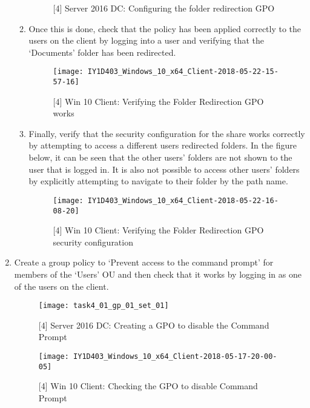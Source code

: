 \begin{enumerate}[series=task4methodology1]
\begin{enumerate}[label=(\alph*)]
\begin{figure}[H]
          \caption{[4] Server 2016 DC: Configuring the folder redirection GPO}
          \label{fig:task4:gp3a4}
        \end{figure}
      \item Once this is done, check that the policy has been applied correctly to the users on the client by logging into a user and verifying that the `Documents' folder has been redirected.
        \begin{figure}[H]
          \centering
          \captionsetup{skip=2pt}
          \texttt{[image: IY1D403\_Windows\_10\_x64\_Client-2018-05-22-15-57-16]}
          \caption{[4] Win 10 Client: Verifying the Folder Redirection GPO works}
          \label{fig:task4:gp3b1}
        \end{figure}
      \item Finally, verify that the security configuration for the share works correctly by attempting to access a different users redirected folders. In the figure below, it can be seen that the other users' folders are not shown to the user that is logged in. It is also not possible to access other users' folders by explicitly attempting to navigate to their folder by the path name.
        \begin{figure}[H]
          \centering
          \captionsetup{skip=2pt}
          \texttt{[image: IY1D403\_Windows\_10\_x64\_Client-2018-05-22-16-08-20]}
          \caption{[4] Win 10 Client: Verifying the Folder Redirection GPO security configuration}
          \label{fig:task4:gp3b2}
        \end{figure}
    \end{enumerate}
  \item Create a group policy to `Prevent access to the command prompt' for members of the `Users' OU and then check that it works by logging in as one of the users on the client.
    \begin{figure}[H]
      \centering
      \captionsetup{skip=2pt}
      \texttt{[image: task4\_01\_gp\_01\_set\_01]}
      \caption{[4] Server 2016 DC: Creating a GPO to disable the Command Prompt}
      \label{fig:task4:gp1a}
    \end{figure}
    \begin{figure}[H]
      \centering
      \captionsetup{skip=2pt}
      \texttt{[image: IY1D403\_Windows\_10\_x64\_Client-2018-05-17-20-00-05]}
      \caption{[4] Win 10 Client: Checking the GPO to disable Command Prompt}
      \label{fig:task4:gp1b}
    \end{figure}

\end{enumerate}
